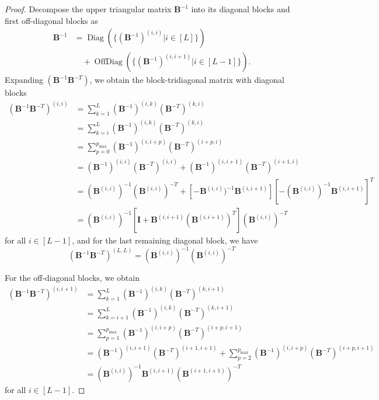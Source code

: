 \documentclass[a4paper, 11pt, oneside]{scrartcl}
\theoremstyle{break}
\DeclareMathOperator{\Diag}{Diag}
\DeclareMathOperator{\OffDiag}{OffDiag}
\newcommand{\matr}[1]{\boldsymbol{#1}}
\numberwithin{equation}{section}
\begin{document}
				\begin{proof}
					Decompose the upper triangular matrix $\matr{B}^{-1}$ into its diagonal blocks and first off-diagonal blocks as 
					\begin{align}
						\matr{B}^{-1} & = \Diag \left( \{ (\matr{B}^{-1})^{(i, i)} | i \in [L] \} \right) \\
						& \quad + \OffDiag \left( \{ (\matr{B}^{-1})^{(i, i+1)} | i \in [L-1] \} \right).
					\end{align}
					Expanding $(\matr{B}^{-1} \matr{B}^{-T})$, we obtain the block-tridiagonal matrix with diagonal blocks
					\begin{align*}
						(\matr{B}^{-1} \matr{B}^{-T})^{(i, i)} &= \sum_{k=1}^L (\matr{B}^{-1})^{(i, k)} (\matr{B}^{-T})^{(k, i)} \\
						&= \sum_{k=i}^L (\matr{B}^{-1})^{(i, k)} (\matr{B}^{-T})^{(k, i)} \\
						&= \sum_{p=0}^{p_{\text{max}}} (\matr{B}^{-1})^{(i, i+p)} (\matr{B}^{-T})^{(i+p, i)} \\
						&= (\matr{B}^{-1})^{(i, i)} (\matr{B}^{-T})^{(i, i)} + (\matr{B}^{-1})^{(i, i+1)} (\matr{B}^{-T})^{(i+1, i)} \\
						&= (\matr{B}^{(i, i)})^{-1} (\matr{B}^{(i, i)})^{-T} + [-\matr{B}^{(i, i)})^{-1} \matr{B}^{(i, i+1)}] [-(\matr{B}^{(i, i)})^{-1}\matr{B}^{(i, i+1)}]^T \\
						&= (\matr{B}^{(i, i)})^{-1} \left[\matr{I} + \matr{B}^{(i, i+1)} (\matr{B}^{(i, i+1)})^T \right] (\matr{B}^{(i, i)})^{-T}
					\end{align*}
					for all $i \in [L-1]$, and for the last remaining diagonal block, we have
					\begin{equation*}
						(\matr{B}^{-1} \matr{B}^{-T})^{(L, L)} = (\matr{B}^{(i, i)})^{-1} (\matr{B}^{(i, i)})^{-T}
					\end{equation*}

					For the off-diagonal blocks, we obtain
					\begin{align*}
						(\matr{B}^{-1} \matr{B}^{-T})^{(i, i+1)} &= \sum_{k=1}^L (\matr{B}^{-1})^{(i, k)} (\matr{B}^{-T})^{(k, i+1)} \\
						&= \sum_{k=i+1}^L (\matr{B}^{-1})^{(i, k)} (\matr{B}^{-T})^{(k, i+1)} \\
						&= \sum_{p=1}^{p_{\text{max}}} (\matr{B}^{-1})^{(i, i+p)} (\matr{B}^{-T})^{(i+p, i+1)} \\
						&= (\matr{B}^{-1})^{(i, i+1)} (\matr{B}^{-T})^{(i+1, i+1)} + \sum_{p=2}^{p_{\text{max}}} (\matr{B}^{-1})^{(i, i+p)} (\matr{B}^{-T})^{(i+p, i+1)} \\
						&= (\matr{B}^{(i, i)})^{-1} \matr{B}^{(i, i+1)} (\matr{B}^{(i+1, i+1)})^{-T}
					\end{align*}
					for all $i \in [L-1]$.
				\end{proof}
\end{document}
